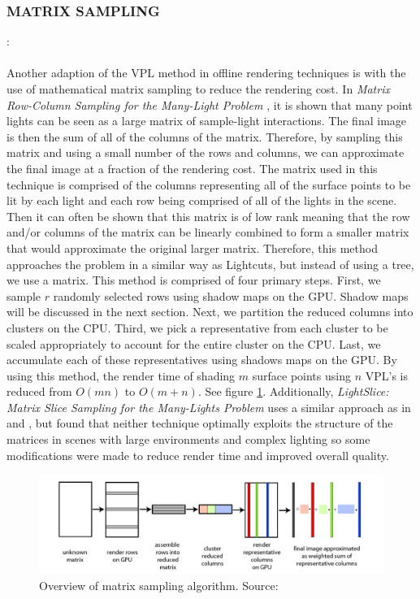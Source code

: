 \subsubsection{MATRIX SAMPLING}: 
\paragraph{}
Another adaption of the VPL method in offline rendering techniques is with the use of mathematical matrix sampling to reduce the rendering cost.  In \textit{Matrix Row-Column Sampling for the Many-Light Problem} \cite{Havsan2007}, it is shown that many point lights can be seen as a large matrix of sample-light interactions.  The final image is then the sum of all of the columns of the matrix.  Therefore, by sampling this matrix and using a small number of the rows and columns, we can approximate the final image at a fraction of the rendering cost.  The matrix used in this technique is comprised of the columns representing all of the surface points to be lit by each light and each row being comprised of all of the lights in the scene.  Then it can often be shown that this matrix is of low rank meaning that the row and/or columns of the matrix can be linearly combined to form a smaller matrix that would approximate the original larger matrix.  Therefore, this method approaches the problem in a similar way as Lightcuts, but instead of using a tree, we use a matrix.  This method is comprised of four primary steps.  First, we sample $r$ randomly selected rows using shadow maps on the GPU.  Shadow maps will be discussed in the next section.  Next, we partition the reduced columns into clusters on the CPU.  Third, we pick a representative from each cluster to be scaled appropriately to account for the entire cluster on the CPU.  Last, we accumulate each of these representatives using shadows maps on the GPU.  By using this method, the render time of shading $m$ surface points using $n$ VPL's is reduced from $O(mn)$ to $O(m+n)$.  See figure \ref{fig:matrixSampling}.  Additionally, \textit{LightSlice: Matrix Slice Sampling for the Many-Lights Problem} \cite{Ou2011} uses a similar approach as in \cite{Havsan2007} and \cite{Walter2005a}, but found that neither technique optimally exploits the structure of the matrices in scenes with large environments and complex lighting so some modifications were made to reduce render time and improved overall quality.

\begin{figure}[h!]
  \centering
    \includegraphics[width=1.0\textwidth]{matrixSampling.jpg}
  \caption{Overview of matrix sampling algorithm. Source: \protect\cite{Havsan2007}}
	\label{fig:matrixSampling}
\end{figure}

